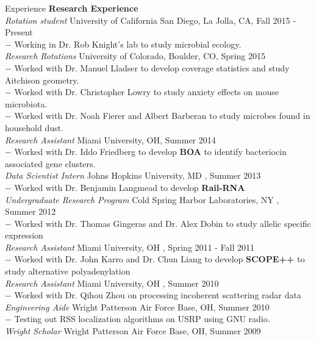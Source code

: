 \documentclass{resume} %
\begin{document}
\begin{rSection}{Experience}
  \textbf{Research Experience}\\
  \textit{Rotation student} \hfill University of California San Diego, La Jolla, CA, Fall 2015 - Present\\
  $-$ Working in Dr. Rob Knight's lab to study microbial ecology.\\
%
  \textit{Research Rotations} \hfill University of Colorado, Boulder, CO, Spring 2015\\
  $-$ Worked with Dr. Manuel Lladser to develop coverage statistics and study Aitchison geometry.\\
  $-$ Worked with Dr. Christopher Lowry to study anxiety effects on mouse microbiota. \\
  $-$ Worked with Dr. Noah Fierer and Albert Barberan to study microbes found in household dust.\\[1 mm]
%
  \textit{Research Assistant} \hfill Miami University, OH, Summer 2014\\
  $-$ Worked with Dr. Iddo Friedberg to develop \textbf{BOA} to identify bacteriocin associated gene clusters.\\
%
  \textit{Data Scientist Intern} \hfill Johns Hopkins University, MD , Summer 2013 \\
  $-$ Worked with Dr. Benjamin Langmead to develop \textbf{Rail-RNA} \\
%
  \textit{Undergraduate Research Program} \hfill Cold Spring Harbor Laboratories, NY , Summer 2012 \\
  $-$ Worked with Dr. Thomas Gingeras and Dr. Alex Dobin to study allelic specific expression\\
%
  \textit{Research Assistant} \hfill Miami University, OH , Spring 2011 - Fall 2011 \\
  $-$ Worked with Dr. John Karro and Dr. Chun Liang to develop \textbf{SCOPE++} to study  alternative polyadenylation\\
  \textit{Research Assistant} \hfill Miami University, OH , Summer 2010 \\
  $-$ Worked with Dr. Qihou Zhou on processing incoherent scattering radar data\\
%
  \textit{Engineering Aide} \hfill Wright Patterson Air Force Base, OH, Summer 2010 \\
  $-$ Testing out RSS localization algorithms on USRP using GNU radio. \\
%
  \textit{Wright Scholar} \hfill Wright Patterson Air Force Base, OH, Summer 2009 \\

\end{rSection}
\end{document}
